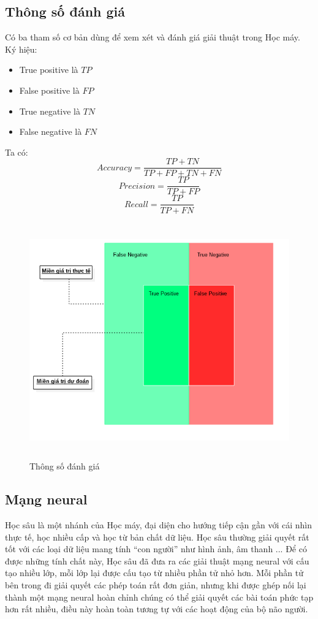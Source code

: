 \subsection{Thông số đánh giá}
Có ba tham số cơ bản dùng để xem xét và đánh giá giải thuật trong Học máy.
Ký hiệu:
\begin{itemize}
\item True positive là $TP$
\item False positive là $FP$
\item True negative là $TN$
\item False negative là $FN$
\end{itemize}
Ta có:\\
\[
  Accuracy = \frac{TP+TN}{TP+FP+TN+FN}
\]
\[
  Precision = \frac{TP}{TP+FP}
\]
\[
  Recall = \frac{TP}{TP+FN}
\]
\begin{figure}[h!]
\centering
\includegraphics[height=4in, keepaspectratio=true]{precision_recall.png}
\caption{Thông số đánh giá}
\end{figure}
\subsection{Mạng neural}
Học sâu là một nhánh của Học máy, đại diện cho hướng tiếp cận gần với cái nhìn 
thực tế, học nhiều cấp và học từ bản chất dữ liệu. Học sâu thường giải quyết 
rất tốt với các loại dữ liệu mang tính ``con người'' như hình ảnh, âm thanh ... 
Để có được những tính chất này, Học sâu đã đưa ra các giải thuật mạng neural 
với cấu tạo nhiều lớp, mỗi lớp lại được cấu tạo từ nhiều phần tử nhỏ hơn. Mỗi 
phần tử bên trong đi giải quyết các phép toán rất đơn giản, nhưng khi được ghép 
nối lại thành một mạng neural hoàn chỉnh chúng có thể giải quyết các bài toán 
phức tạp hơn rất nhiều, điều này hoàn toàn tương tự với các hoạt động của bộ 
não người. \cite{NeuralNetworksandDeepLearning} 
